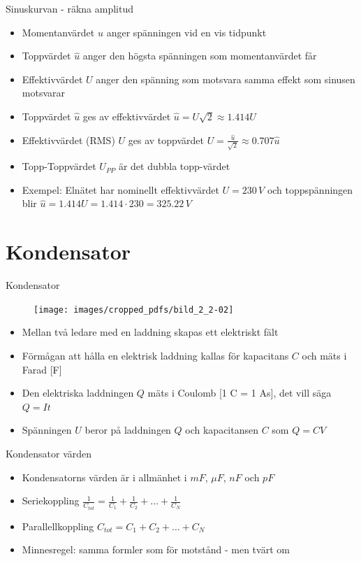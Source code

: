 \documentclass{beamer}
\begin{document}
\begin{frame}{Sinuskurvan - räkna amplitud}
  \begin{itemize}
  \item Momentanvärdet $u$ anger spänningen vid en vis tidpunkt
  \item Toppvärdet $\hat{u}$ anger den högsta spänningen som momentanvärdet får
  \item Effektivvärdet $U$ anger den spänning som motsvara samma effekt som sinusen motsvarar
  \item Toppvärdet $\hat{u}$ ges av effektivvärdet $\hat{u} = U\sqrt{2} \approx 1.414 U$
  \item Effektivvärdet (RMS) $U$ ges av toppvärdet $U = \frac{\hat{u}}{\sqrt{2}} \approx 0.707 \hat{u}$
  \item Topp-Toppvärdet $U_{PP}$ är det dubbla topp-värdet
  \item Exempel: Elnätet har nominellt effektivvärdet $U=230\,V$ och toppspänningen blir $\hat{u} = 1.414U = 1.414\cdot230 = 325.22\,V$
  \end{itemize}
\end{frame}

\section{Kondensator}

\begin{frame}{Kondensator}

\begin{figure}[h]
\texttt{[image: images/cropped\_pdfs/bild\_2\_2-02]}
\end{figure}

\begin{itemize}
  \item Mellan två ledare med en laddning skapas ett elektriskt fält
  \item Förmågan att hålla en elektrisk laddning kallas för kapacitans $C$ och mäts i Farad [F]
  \item Den elektriska laddningen $Q$ mäts i Coulomb [1 C = 1 As], det vill säga $Q=It$
  \item Spänningen $U$ beror på laddningen $Q$ och kapacitansen $C$ som $Q=CV$
\end{itemize}
\end{frame}

\begin{frame}{Kondensator värden}
  \begin{itemize}
    \item Kondensatorns värden är i allmänhet i $mF$, $\mu F$, $nF$ och $pF$
    \item Seriekoppling $\frac{1}{C_{tot}} = \frac{1}{C_1} + \frac{1}{C_2} + \ldots + \frac{1}{C_N}$
    \item Parallellkoppling $C_{tot} = C_1 + C_2 + \ldots + C_N$
    \item Minnesregel: samma formler som för motstånd - men tvärt om
  \end{itemize}
\end{frame}
\end{document}

